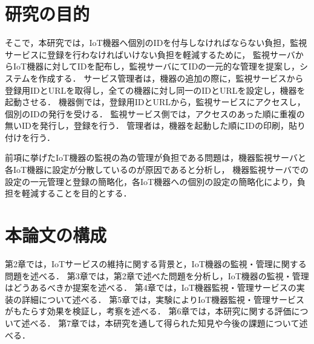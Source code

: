 \section{研究の目的}
そこで，本研究では，IoT機器へ個別のIDを付与しなければならない負担，監視サービスに登録を行わなければいけない負担を軽減するために，
監視サーバからIoT機器に対してIDを配布し，監視サーバにてIDの一元的な管理を提案し，システムを作成する．
サービス管理者は，機器の追加の際に，監視サービスから登録用IDとURLを取得し，全ての機器に対し同一のIDとURLを設定し，機器を起動させる．
機器側では，登録用IDとURLから，監視サービスにアクセスし，個別のIDの発行を受ける．
監視サービス側では，アクセスのあった順に重複の無いIDを発行し，登録を行う．
管理者は，機器を起動した順にIDの印刷，貼り付けを行う．
\medskip

前項に挙げたIoT機器の監視の為の管理が負担である問題は，機器監視サーバと各IoT機器に設定が分散しているのが原因であると分析し，
機器監視サーバでの設定の一元管理と登録の簡略化，各IoT機器への個別の設定の簡略化により，負担を軽減することを目的とする．

\section{本論文の構成}
第2章では，IoTサービスの維持に関する背景と，IoT機器の監視・管理に関する問題を述べる．
第3章では，第2章で述べた問題を分析し，IoT機器の監視・管理はどうあるべきか提案を述べる．
第4章では，IoT機器監視・管理サービスの実装の詳細について述べる．
第5章では，実験によりIoT機器監視・管理サービスがもたらす効果を検証し，考察を述べる．
第6章では，本研究に関する評価について述べる．
第7章では，本研究を通して得られた知見や今後の課題について述べる．


